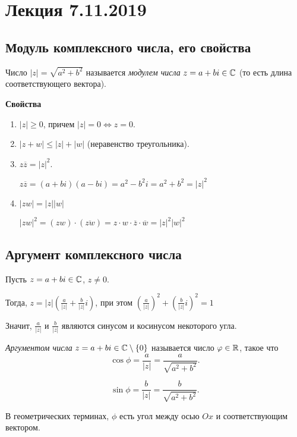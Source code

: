 \section{Лекция 7.11.2019}

\subsection{Модуль комплексного числа, его свойства}

\begin{definition}
    Число $|z| = \sqrt{a^2 + b^2}$ называется \textit{модулем числа} $z = a + bi \in \mathbb{C}$ (то есть длина соответствующего вектора).
\end{definition}

\textbf{Свойства}
\begin{enumerate}
\item $|z| \geq 0$, причем $|z| = 0 \iff z = 0$.
\item $|z + w| \leq |z| + |w|$ (неравенство треугольника).
\item $z \overline{z} = |z|^2$.

    $z \overline{z} = (a + bi)(a - bi) = a^2 - b^2i = a^2 + b^2 = |z|^2$
\item $|zw| = |z||w|$

    $|zw|^2 = (zw) \cdot (\overline{zw}) = z \cdot w \cdot \overline{z} \cdot \overline{w} = |z|^2 |w|^2$
\end{enumerate}

\begin{comment}
    Из 3) следует, что для $\forall z \neq 0$, $z^{-1} = \frac{\overline{z}}{|z|^2}$, то есть $(a + bi)^{-1} = \frac{a-bi}{a^2 + b^2}$
\end{comment}


\subsection{Аргумент комплексного числа}

Пусть $z = a + bi \in \mathbb{C}$, $z \neq 0$.

Тогда, $z = |z| \left(\frac{a}{|z|} + \frac{b}{|z|}i\right)$, при этом $\left(\frac{a}{|z|}\right)^2 + \left(\frac{b}{|z|}i\right)^2 = 1$

Значит, $\frac{a}{|z|}$ и $\frac{b}{|z|}$ являются синусом и косинусом некоторого угла.

\begin{definition}
    \textit{Аргументом числа} $z = a + bi \in \mathbb{C} \setminus \{0\}$ называется число $\varphi \in \mathbb{R}$, такое что
    \begin{equation*}
        \cos \phi = \frac{a}{|z|} = \frac{a} {\sqrt{a^2 + b^2}}
    .\end{equation*}

    \begin{equation*}
        \sin \phi = \frac{b}{|z|} = \frac{b}{\sqrt{a^2 + b^2}}
    .\end{equation*}

    В геометрических терминах, $\phi$ есть угол между осью $Ox$ и соответствующим вектором.
\end{definition}

